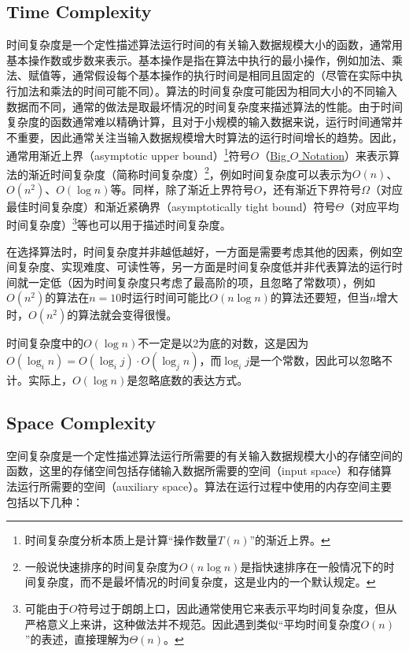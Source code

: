 \subsection{Time Complexity}
时间复杂度是一个定性描述算法运行时间的有关输入数据规模大小的函数，通常用基本操作数或步数来表示。基本操作是指在算法中执行的最小操作，例如加法、乘法、赋值等，通常假设每个基本操作的执行时间是相同且固定的（尽管在实际中执行加法和乘法的时间可能不同）。算法的时间复杂度可能因为相同大小的不同输入数据而不同，通常的做法是取最坏情况的时间复杂度来描述算法的性能。由于时间复杂度的函数通常难以精确计算，且对于小规模的输入数据来说，运行时间通常并不重要，因此通常关注当输入数据规模增大时算法的运行时间增长的趋势。因此，通常用渐近上界（asymptotic upper bound）\footnote{时间复杂度分析本质上是计算“操作数量$T(n)$”的渐近上界。}符号$O$（\href{https://www.wikiwand.com/en/articles/Big_O_notation}{Big $O$ Notation}）来表示算法的渐近时间复杂度（简称时间复杂度）\footnote{一般说快速排序的时间复杂度为$O(n\log n)$是指快速排序在一般情况下的时间复杂度，而不是最坏情况的时间复杂度，这是业内的一个默认规定。}，例如时间复杂度可以表示为$O(n)$、$O(n^2)$、$O(\log n)$等。同样，除了渐近上界符号$O$，还有渐近下界符号$\Omega$（对应最佳时间复杂度）和渐近紧确界（asymptotically tight bound）符号$\Theta$（对应平均时间复杂度）\footnote{可能由于$O$符号过于朗朗上口，因此通常使用它来表示平均时间复杂度，但从严格意义上来讲，这种做法并不规范。因此遇到类似“平均时间复杂度$O(n)$”的表述，直接理解为$\Theta(n)$。}等也可以用于描述时间复杂度\cite{cormenIntroductionAlgorithms2009}。

在选择算法时，时间复杂度并非越低越好，一方面是需要考虑其他的因素，例如空间复杂度、实现难度、可读性等，另一方面是时间复杂度低并非代表算法的运行时间就一定低（因为时间复杂度只考虑了最高阶的项，且忽略了常数项），例如$O(n^2)$的算法在$n=10$时运行时间可能比$O(n\log n)$的算法还要短，但当$n$增大时，$O(n^2)$的算法就会变得很慢。

时间复杂度中的$O(\log n)$不一定是以2为底的对数，这是因为$O(\log_i n) = O(\log_i j) \cdot O(\log_j n)$，而$\log_i j$是一个常数，因此可以忽略不计。实际上，$O(\log n)$是忽略底数的表达方式。

\subsection{Space Complexity}
空间复杂度是一个定性描述算法运行所需要的有关输入数据规模大小的存储空间的函数，这里的存储空间包括存储输入数据所需要的空间（input space）和存储算法运行所需要的空间（auxiliary space）。算法在运行过程中使用的内存空间主要包括以下几种：

